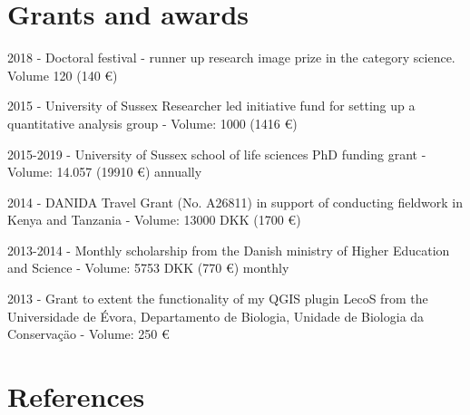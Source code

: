 \documentclass[12pt,a4paper,serif]{moderncv}        %
\begin{document}
\vspace{8pt}

\section{Grants and awards}

\begin{bibenum}
    \item[] 2018 - Doctoral festival - runner up research image prize in the category science. Volume 120 \textsterling \hspace{1pt} (140 \euro )
    \item[] 2015 - University of Sussex Researcher led initiative fund for setting up a quantitative analysis group - Volume: 1000  \textsterling \hspace{1pt} (1416 \euro )
    \item[] 2015-2019 - University of Sussex school of life sciences PhD funding grant - Volume: 14.057 \textsterling \hspace{1pt} (19910 \euro) annually 
    \item[] 2014 - DANIDA Travel Grant (No. A26811) in support of conducting fieldwork in Kenya and Tanzania - Volume: 13000 DKK (1700 \euro)
    \item[] 2013-2014 - Monthly scholarship from the Danish ministry of Higher Education and Science - Volume: 5753 DKK (770 \euro) monthly
    \item[] 2013 - Grant to extent the functionality of my QGIS plugin LecoS from the Universidade de \'{E}vora, Departamento de Biologia, Unidade de Biologia da Conserva\c{c}\"{a}o  - Volume: 250 \euro

\end{bibenum}

\vspace{8pt}
\section{References}

\vspace{6pt}
 

\end{document}
